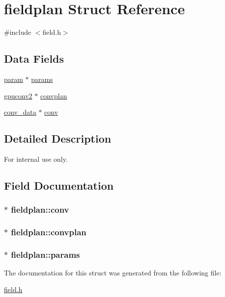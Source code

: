 \hypertarget{structfieldplan}{
\section{fieldplan Struct Reference}
\label{structfieldplan}
}


{\ttfamily \#include $<$field.h$>$}

\subsection*{Data Fields}
\begin{DoxyCompactItemize}
\item 
\hyperlink{structparam}{param} $\ast$ \hyperlink{structfieldplan_a613411fa1ea9934e3129cc3e540c250f}{params}
\item 
\hyperlink{structgpuconv2}{gpuconv2} $\ast$ \hyperlink{structfieldplan_afaf94abb1094a49c191e9d904c620a5d}{convplan}
\item 
\hyperlink{structconv__data}{conv\_\-data} $\ast$ \hyperlink{structfieldplan_ab708805d02b7ecbcee407881cfd3db83}{conv}
\end{DoxyCompactItemize}


\subsection{Detailed Description}
\begin{DoxyInternal}{For internal use only.}
\end{DoxyInternal}


\subsection{Field Documentation}
\hypertarget{structfieldplan_ab708805d02b7ecbcee407881cfd3db83}{
\subsubsection[{conv}]{$\ast$ {\bf fieldplan::conv}}}
\label{structfieldplan_ab708805d02b7ecbcee407881cfd3db83}
\hypertarget{structfieldplan_afaf94abb1094a49c191e9d904c620a5d}{
\subsubsection[{convplan}]{$\ast$ {\bf fieldplan::convplan}}}
\label{structfieldplan_afaf94abb1094a49c191e9d904c620a5d}
\hypertarget{structfieldplan_a613411fa1ea9934e3129cc3e540c250f}{
\subsubsection[{params}]{$\ast$ {\bf fieldplan::params}}}
\label{structfieldplan_a613411fa1ea9934e3129cc3e540c250f}


The documentation for this struct was generated from the following file:\begin{DoxyCompactItemize}
\item 
\hyperlink{field_8h}{field.h}\end{DoxyCompactItemize}

